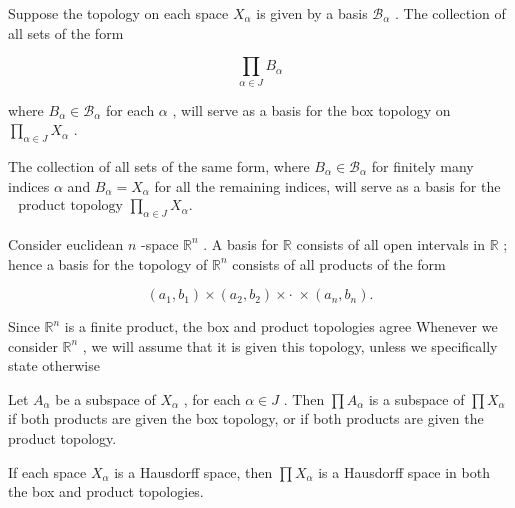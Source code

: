 \begin{theorem} Suppose the topology on each space \({X}_{\alpha }\) is given by a basis \({\mathcal{B}}_{\alpha }\) . The collection of all sets of the form

\[
\mathop{\prod }\limits_{{\alpha  \in  J}}{B}_{\alpha }
\]

where \({B}_{\alpha } \in  {\mathcal{B}}_{\alpha }\) for each \(\alpha\) , will serve as a basis for the box topology on \(\mathop{\prod }\limits_{{\alpha  \in  J}}{X}_{\alpha }\) .

The collection of all sets of the same form, where \({B}_{\alpha } \in  {\mathcal{B}}_{\alpha }\) for finitely many indices \(\alpha\) and \({B}_{\alpha } = {X}_{\alpha }\) for all the remaining indices, will serve as a basis for the \(\begin{matrix} \text{ product topology }\mathop{\prod }\limits_{{\alpha  \in  J}}{X}_{\alpha }. \end{matrix}\)

\begin{example} Consider euclidean \(n\) -space \({\mathbb{R}}^{n}\) . A basis for \(\mathbb{R}\) consists of all open intervals in \(\mathbb{R}\) ; hence a basis for the topology of \({\mathbb{R}}^{n}\) consists of all products of the form

\[
\left( {{a}_{1},{b}_{1}}\right)  \times  \left( {{a}_{2},{b}_{2}}\right)  \times   \cdot  \; \times  \left( {{a}_{n},{b}_{n}}\right) .
\]

Since \({\mathbb{R}}^{n}\) is a finite product, the box and product topologies agree Whenever we consider \({\mathbb{R}}^{n}\) , we will assume that it is given this topology, unless we specifically state otherwise
\end{example}

\end{theorem}
\begin{theorem} Let \({A}_{\alpha }\) be a subspace of \({X}_{\alpha }\) , for each \(\alpha  \in  J\) . Then \(\prod {A}_{\alpha }\) is a subspace of \(\prod {X}_{\alpha }\) if both products are given the box topology, or if both products are given the product topology.

\end{theorem}
\begin{theorem} If each space \({X}_{\alpha }\) is a Hausdorff space, then \(\prod {X}_{\alpha }\) is a Hausdorff space in both the box and product topologies.

\end{theorem}
